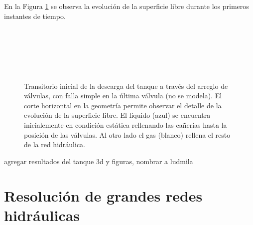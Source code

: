 En la Figura \ref{evol-ls} se observa la evolución de la superficie libre durante los primeros instantes de tiempo.

\begin{figure}['ht]
\begin{minipage}[t]{.48\textwidth}
\centering
{}\\
\\
\end{minipage}\hfill
\begin{minipage}[t]{.48\textwidth}
\centering
{}\\
\\
\end{minipage}
\caption{Transitorio inicial de la descarga del tanque a través del arreglo de válvulas, con falla simple en la última válvula
  (no se modela).
	El corte horizontal en la geometría permite observar el detalle de la evolución de la superficie libre.
  El líquido (azul) se encuentra inicialemente en condición estática rellenando las cañerías hasta la posición de las válvulas.
  Al otro lado el gas (blanco) rellena el resto de la red hidráulica.}  
\label{evol-ls}
\end{figure}

agregar resultados del tanque 3d y figuras, nombrar a ludmila

\section{Resolución de grandes redes hidráulicas}
\label{3:redes}
